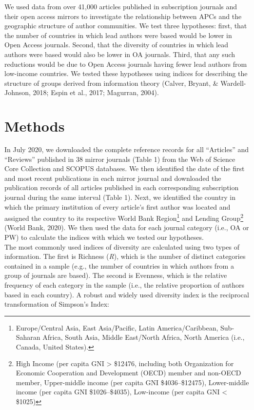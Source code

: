 \documentclass[english,man]{apa6}
\begin{document}
We used data from over 41,000 articles published in subscription journals and their open access mirrors to investigate the relationship between APCs and the geographic structure of author communities. We test three hypotheses: first, that the number of countries in which lead authors were based would be lower in Open Access journals. Second, that the diversity of countries in which lead authors were based would also be lower in OA journals. Third, that any such reductions would be due to Open Access journals having fewer lead authors from low-income countries. We tested these hypotheses using indices for describing the structure of groups derived from information theory (Calver, Bryant, \& Wardell-Johnson, 2018; Espin et al., 2017; Magurran, 2004).

\hypertarget{methods}{%
\section{Methods}\label{methods}}

In July 2020, we downloaded the complete reference records for all \enquote{Articles} and \enquote{Reviews} published in 38 mirror journals (Table 1) from the Web of Science Core Collection and SCOPUS databases. We then identified the date of the first and most recent publications in each mirror journal and downloaded the publication records of all articles published in each corresponding subscription journal during the same interval (Table 1). Next, we identified the country in which the primary institution of every article's first author was located and assigned the country to its respective World Bank Region\footnote{Europe/Central Asia, East Asia/Pacific, Latin America/Caribbean, Sub-Saharan Africa, South Asia, Middle East/North Africa, North America (i.e., Canada, United States).} and Lending Group\footnote{High Income (per capita GNI \textgreater{} \$12476, including both Organization for Economic Cooperation and Development (OECD) member and non-OECD member, Upper-middle income (per capita GNI \$4036--\$12475), Lower-middle income (per capita GNI \$1026--\$4035), Low-income (per capita GNI \textless{} \$1025)} (World Bank, 2020). We then used the data for each journal category (i.e., OA or PW) to calculate the indices with which we tested our hypotheses.\\
The most commonly used indices of diversity are calculated using two types of information. The first is Richness (\emph{R}), which is the number of distinct categories contained in a sample (e.g., the number of countries in which authors from a group of journals are based). The second is Evenness, which is the relative frequency of each category in the sample (i.e., the relative proportion of authors based in each country). A robust and widely used diversity index is the reciprocal transformation of Simpson's Index:
\end{document}
